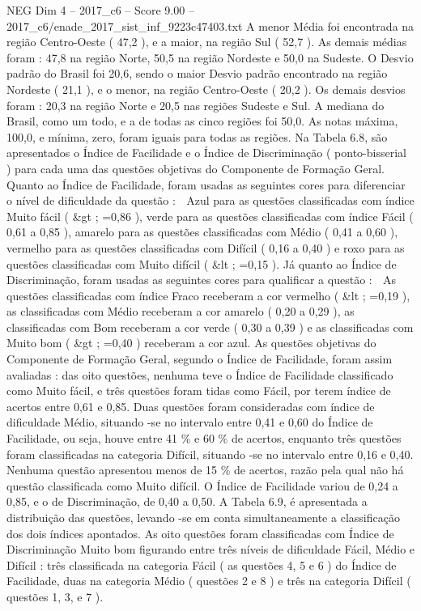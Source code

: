 \begin{textsample}{NEG Dim 4 – 2017\_c6 – Score 9.00 – 2017\_c6/enade\_2017\_sist\_inf\_9223c47403.txt}
A menor Média foi encontrada na região Centro-Oeste ( 47,2 ), e a maior, na região Sul ( 52,7 ).
As demais médias foram : 47,8 na região Norte, 50,5 na região Nordeste e 50,0 na Sudeste.
O Desvio padrão do Brasil foi 20,6, sendo o maior Desvio padrão encontrado na região Nordeste ( 21,1 ), e o menor, na região Centro-Oeste ( 20,2 ).
Os demais desvios foram : 20,3 na região Norte e 20,5 nas regiões Sudeste e Sul.
A mediana do Brasil, como um todo, e a de todas as cinco regiões foi 50,0.
As notas máxima, 100,0, e mínima, zero, foram iguais para todas as regiões.
Na Tabela 6.8, são apresentados o Índice de Facilidade e o Índice de Discriminação ( ponto-bisserial ) para cada uma das questões objetivas do Componente de Formação Geral.
Quanto ao Índice de Facilidade, foram usadas as seguintes cores para diferenciar o nível de dificuldade da questão :  Azul para as questões classificadas com índice Muito fácil ( \&gt ; =0,86 ), verde para as questões classificadas com índice Fácil ( 0,61 a 0,85 ), amarelo para as questões classificadas com Médio ( 0,41 a 0,60 ), vermelho para as questões classificadas com Difícil ( 0,16 a 0,40 ) e roxo para as questões classificadas com Muito difícil ( \&lt ; =0,15 ).
Já quanto ao Índice de Discriminação, foram usadas as seguintes cores para qualificar a questão :  As questões classificadas com índice Fraco receberam a cor vermelho ( \&lt ; =0,19 ), as classificadas com Médio receberam a cor amarelo ( 0,20 a 0,29 ), as classificadas com Bom receberam a cor verde ( 0,30 a 0,39 ) e as classificadas com Muito bom ( \&gt ; =0,40 ) receberam a cor azul.
As questões objetivas do Componente de Formação Geral, segundo o Índice de Facilidade, foram assim avaliadas : das oito questões, nenhuma teve o Índice de Facilidade classificado como Muito fácil, e três questões foram tidas como Fácil, por terem índice de acertos entre 0,61 e 0,85.
Duas questões foram consideradas com índice de dificuldade Médio, situando -se no intervalo entre 0,41 e 0,60 do Índice de Facilidade, ou seja, houve entre 41 \% e 60 \% de acertos, enquanto três questões foram classificadas na categoria Difícil, situando -se no intervalo entre 0,16 e 0,40.
Nenhuma questão apresentou menos de 15 \% de acertos, razão pela qual não há questão classificada como Muito difícil.
O Índice de Facilidade variou de 0,24 a 0,85, e o de Discriminação, de 0,40 a 0,50.
A Tabela 6.9, é apresentada a distribuição das questões, levando -se em conta simultaneamente a classificação dos dois índices apontados.
As oito questões foram classificadas com Índice de Discriminação Muito bom figurando entre três níveis de dificuldade Fácil, Médio e Difícil : três classificada na categoria Fácil ( as questões 4, 5 e 6 ) do Índice de Facilidade, duas na categoria Médio ( questões 2 e 8 ) e três na categoria Difícil ( questões 1, 3, e 7 ).

\end{textsample}
